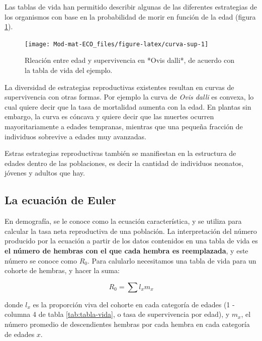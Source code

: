 \documentclass[
]{book}
\begin{document}
Las tablas de vida han permitido describir algunas de las diferentes estrategias de los organismos con base en la probabilidad de morir en función de la edad (figura \ref{fig:curva-sup}).

\begin{figure}

{\centering \texttt{[image: Mod-mat-ECO\_files/figure-latex/curva-sup-1]} 

}

\caption{Rleación entre edad y supervivencia en *Ovis dalli*, de acuerdo con la tabla de vida del ejemplo.}\label{fig:curva-sup}
\end{figure}

La diversidad de estrategias reproductivas existentes resultan en curvas de supervivencia con otras formas. Por ejemplo la curva de \emph{Ovis dalli} es convexa, lo cual quiere decir que la tasa de mortalidad aumenta con la edad. En plantas sin embargo, la curva es cóncava y quiere decir que las muertes ocurren mayoritariamente a edades tempranas, mientras que una pequeña fracción de individuos sobrevive a edades muy avanzadas.

Estras estrategias reproductivas también se manifiestan en la estructura de edades dentro de las poblaciones, es decir la cantidad de individuos neonatos, jóvenes y adultos que hay.

\hypertarget{la-ecuaciuxf3n-de-euler}{%
\subsection{La ecuación de Euler}\label{la-ecuaciuxf3n-de-euler}}

En demografía, se le conoce como la ecuación característica, y se utiliza para calcular la tasa neta reproductiva de una población. La interpretación del número producido por la ecuación a partir de los datos contenidos en una tabla de vida es \textbf{el número de hembras con el que cada hembra es reemplazada}, y este número se conoce como \(R_0\). Para calularlo necesitamos una tabla de vida para un cohorte de hembras, y hacer la suma:

\begin{equation}
R_0 = \sum l_x m_x \label{eq:Euler-demog}
\end{equation}

donde \(l_x\) es la proporción viva del cohorte en cada categoría de edades (1 - columna 4 de tabla \ref{tab:tabla-vida}, o tasa de supervivencia por edad), y \(m_x\), el número promedio de descendientes hembras por cada hembra en cada categoría de edades \(x\).
\end{document}
